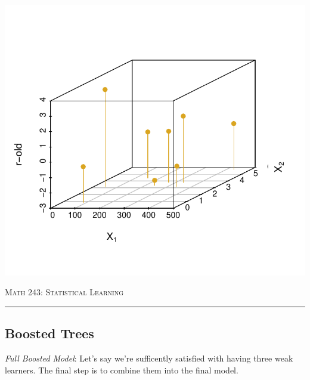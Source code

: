 \documentclass{article}\usepackage[]{graphicx}\usepackage[]{color}
\begin{document}
\begin{enumerate}
\begin{center}
{\includegraphics[scale=0.9]{scatterC.pdf}}
\end{center}

\end{enumerate}

\newpage

\begin{center}
\textsc{Math 243: Statistical Learning} \\
\noindent\rule{12cm}{0.4pt}
\end{center}

\subsection*{Boosted Trees}

\emph{Full Boosted Model}: Let's say we're sufficently satisfied with having three weak learners. The final step is to combine them into the final model.
\end{document}

